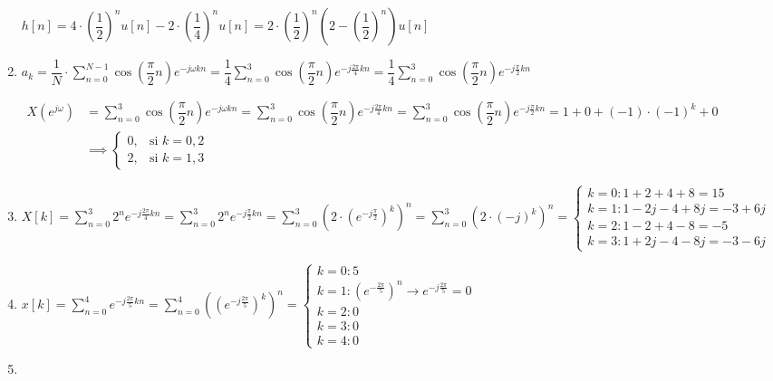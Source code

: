 \begin{enumerate}[label=\color{red}\textbf{\arabic*)}]
$h[n]=4\cdot \left( \dfrac{1}{2} \right) ^{n}u[n]-2\cdot \left( \dfrac{1}{4} \right) ^{n}u[n]=2\cdot \left( \dfrac{1}{2} \right) ^{n}\left( 2-\left( \dfrac{1}{2} \right) ^{n} \right) u[n]$
\item {} 

$a_k=\dfrac{1}{N}\cdot \sum_{n=0}^{N-1} \cos\left( \dfrac{\pi}{2}n \right) e^{-j\omega kn}=\dfrac{1}{4}\sum_{n=0}^{3} \cos\left( \dfrac{\pi}{2}n \right) e^{-j\frac{2\pi}{4} kn}=\dfrac{1}{4}\sum_{n=0}^{3} \cos\left( \dfrac{\pi}{2}n \right) e^{-j\frac{\pi}{2} kn}$ 

$
\begin{aligned}
X(e^{j\omega} )&=\sum_{n=0}^{3} \cos\left( \dfrac{\pi}{2}n \right) e^{-j\omega kn}=\sum_{n=0}^{3} \cos\left( \dfrac{\pi}{2}n \right) e^{-j\frac{2\pi}{4} kn} =\sum_{n=0}^{3} \cos\left( \dfrac{\pi}{2}n \right) e^{-j\frac{\pi}{2} kn} =1+0+(-1)\cdot (-1)^k +0\\
               &\implies \begin{cases}
    0, & \text{si }k=0,2\\
    2, & \text{si }k=1,3
\end{cases}
\end{aligned}
$
\item {} 

    $X[k]=\sum_{n=0}^{3} 2^ne^{-j\frac{2\pi}{4} kn}=\sum_{n=0}^{3} 2^ne^{-j\frac{\pi}{2} kn} =\sum_{n=0}^{3} \left( 2\cdot \left( e^{-j\frac{\pi}{2} }  \right) ^k \right) ^n=\sum_{n=0}^{3} (2\cdot (-j)^k)^n =\begin{cases}
        k=0:1+2+4+8=15\\
        k=1:1-2j-4+8j=-3+6j\\
        k=2:1-2+4-8=-5\\
        k=3:1+2j-4-8j=-3-6j
    \end{cases}$
\item {} 

    $x[k]=\sum_{n=0}^{4} e^{-j\frac{2\pi}{5} kn} =\sum_{n=0}^{4} \left( \left( e^{-j\frac{2\pi}{5} }  \right) ^k \right) ^n=\begin{cases}
        k=0:5\\
        k=1:\left( e^{-\frac{2\pi}{5} }  \right) ^n\to e^{-j\frac{2\pi}{5} } =0\\
        k=2:0\\
        k=3:0\\
        k=4:0
    \end{cases}$
    \newpage
\item {} 


\end{enumerate}
